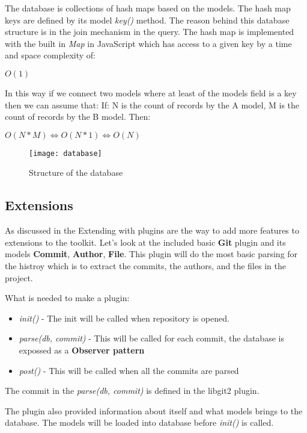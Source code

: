 The database is collections of hash maps based on the models. The hash map keys are defined by its model \textit{key()} method.
The reason behind this database structure is in the join mechanism in the query. The hash map is implemented with the built in 
\textit{Map}\cite{map} in JavaScript which has access to a given key by a time and space complexity of:

\( O(1) \)

In this way if we connect two models where at least of the models field is a key then we can assume that:\newline
If: N is the count of records by the A model, M  is the count of records by the B model. Then:
	
\(O(N * M) \Leftrightarrow O(N * 1) \Leftrightarrow O(N)\)

\begin{figure}[H]
	\centering
	\texttt{[image: database]}
	\caption{Structure of the database}
	\label{fig:fig-help}
\end{figure}

\subsection{Extensions}

As discussed in the Extending with plugins are the way to add more features to extensions to the toolkit.
Let's look at the included basic \textbf{Git} plugin and its models \textbf{Commit}, \textbf{Author}, \textbf{File}.
This plugin will do the most basic parsing for the histroy which is to extract the commits, the authors, and the files
in the project.

What is needed to make a plugin:
\begin{itemize}
	\item \textit{init()} - The init will be called when repository is opened.
	\item \textit{parse(db, commit)} - This will be called for each commit, the database is expossed as a \textbf{Observer pattern}
	\item \textit{post()} - This will be called when all the commits are parsed
\end{itemize}

The commit in the \textit{parse(db, commit)} is defined in the libgit2 plugin.

The plugin also provided information about itself and what models brings to the database. 
The models will be loaded into database before \textit{init()} is called.

